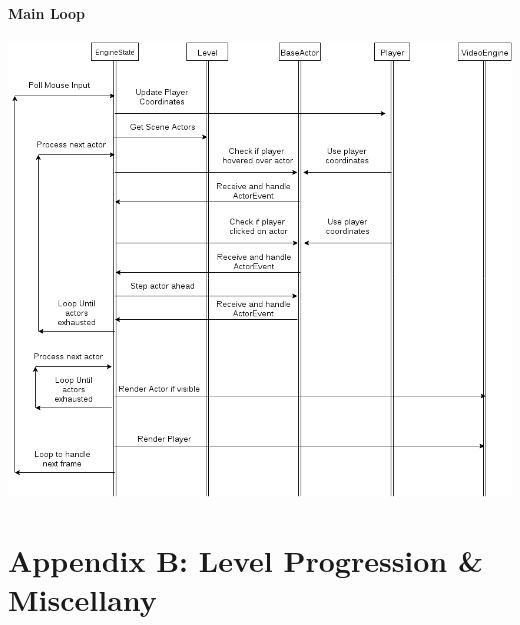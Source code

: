 \documentclass{article}
\begin{document}
			\paragraph{Main Loop}
				\begin{center}
					\includegraphics[scale=0.54,angle=90]{main-loop.png}
				\end{center}
%
%
\newpage
\section{Appendix B: Level Progression \& Miscellany}
\end{document}
